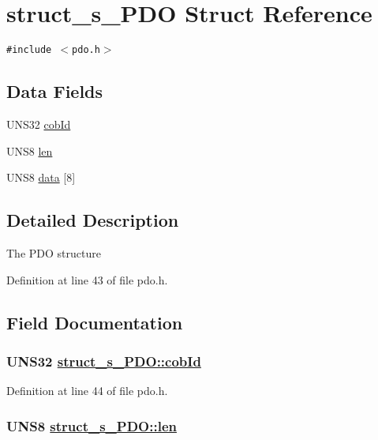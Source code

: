 \hypertarget{structstruct__s__PDO}{
\section{struct\_\-s\_\-PDO Struct Reference}
\label{structstruct__s__PDO}
}
{\tt \#include $<$pdo.h$>$}

\subsection*{Data Fields}
\begin{CompactItemize}
\item 
UNS32 \hyperlink{structstruct__s__PDO_79a70c0ef320cc4c939f825e83e3d5b2}{cob\-Id}
\item 
UNS8 \hyperlink{structstruct__s__PDO_49db07106430da9b89ec526e8ec1573d}{len}
\item 
UNS8 \hyperlink{structstruct__s__PDO_34fdcefa8119162840bccf2d67b5c6c0}{data} \mbox{[}8\mbox{]}
\end{CompactItemize}


\subsection{Detailed Description}
The PDO structure 



Definition at line 43 of file pdo.h.

\subsection{Field Documentation}
\hypertarget{structstruct__s__PDO_79a70c0ef320cc4c939f825e83e3d5b2}{
\subsubsection[cobId]{\setlength{\rightskip}{0pt plus 5cm}UNS32 \hyperlink{structstruct__s__PDO_79a70c0ef320cc4c939f825e83e3d5b2}{struct\_\-s\_\-PDO::cob\-Id}}}
\label{structstruct__s__PDO_79a70c0ef320cc4c939f825e83e3d5b2}




Definition at line 44 of file pdo.h.\hypertarget{structstruct__s__PDO_49db07106430da9b89ec526e8ec1573d}{
\subsubsection[len]{\setlength{\rightskip}{0pt plus 5cm}UNS8 \hyperlink{structstruct__s__PDO_49db07106430da9b89ec526e8ec1573d}{struct\_\-s\_\-PDO::len}}}
\label{structstruct__s__PDO_49db07106430da9b89ec526e8ec1573d}




